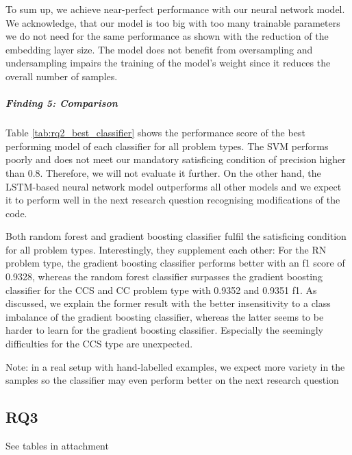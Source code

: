 To sum up, we achieve near-perfect performance with our neural network model. We acknowledge, that our model is too big with too many trainable parameters we do not need for the same performance as shown with the reduction of the embedding layer size. The model does not benefit from oversampling and undersampling impairs the training of the model's weight since it reduces the overall number of samples.

\subparagraph{Finding 5: Comparison}

 Table \ref{tab:rq2_best_classifier} shows the performance score of the best performing model of each classifier for all problem types.
 The SVM performs poorly and does not meet our mandatory satisficing condition of precision higher than 0.8. Therefore, we will not evaluate it further. On the other hand, the LSTM-based neural network model outperforms all other models and we expect it to perform well in the next research question recognising modifications of the code.

 Both random forest and gradient boosting classifier fulfil the satisficing condition for all problem types. Interestingly, they supplement each other: For the RN problem type, the gradient boosting classifier performs better with an f1 score of 0.9328, whereas the random forest classifier surpasses the gradient boosting classifier for the CCS and CC problem type with 0.9352 and 0.9351 f1. As discussed, we explain the former result with the better insensitivity to a class imbalance of the gradient boosting classifier, whereas the latter seems to be harder to learn for the gradient boosting classifier. Especially the seemingly difficulties for the CCS type are unexpected.
 
 Note: in a real setup with hand-labelled examples, we expect more variety in the samples so the classifier may even perform better on the next research question 


 \subsection{RQ3}
See tables in attachment